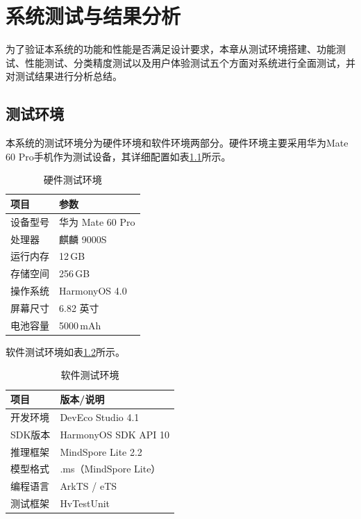 \chapter{系统测试与结果分析}

为了验证本系统的功能和性能是否满足设计要求，本章从测试环境搭建、功能测试、性能测试、分类精度测试以及用户体验测试五个方面对系统进行全面测试，并对测试结果进行分析总结。

\section{测试环境}

本系统的测试环境分为硬件环境和软件环境两部分。硬件环境主要采用华为Mate 60 Pro手机作为测试设备，其详细配置如表\ref{tab:hw-env}所示。

\begin{table}[htbp]
\centering
\caption{硬件测试环境}
\label{tab:hw-env}
\begin{tabular}{ll}
\toprule
项目 & 参数 \\
\midrule
设备型号 & 华为 Mate 60 Pro \\
处理器 & 麒麟 9000S \\
运行内存 & 12\,GB \\
存储空间 & 256\,GB \\
操作系统 & HarmonyOS 4.0 \\
屏幕尺寸 & 6.82 英寸 \\
电池容量 & 5000\,mAh \\
\bottomrule
\end{tabular}
\end{table}

软件测试环境如表\ref{tab:sw-env}所示。

\begin{table}[htbp]
\centering
\caption{软件测试环境}
\label{tab:sw-env}
\begin{tabular}{ll}
\toprule
项目 & 版本/说明 \\
\midrule
开发环境 & DevEco Studio 4.1 \\
SDK版本 & HarmonyOS SDK API 10 \\
推理框架 & MindSpore Lite 2.2 \\
模型格式 & .ms（MindSpore Lite） \\
编程语言 & ArkTS / eTS \\
测试框架 & HvTestUnit \\
\bottomrule
\end{tabular}
\end{table}

